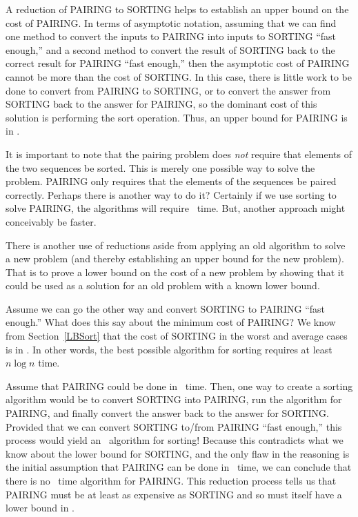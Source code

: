 A reduction of PAIRING to SORTING helps to establish an upper
bound on the cost of PAIRING.
In terms of asymptotic notation, assuming that we can find one method
to convert the inputs to PAIRING into inputs to SORTING ``fast
enough,'' and a second method to convert the result of SORTING back to
the correct result for PAIRING ``fast enough,'' then the asymptotic
cost of PAIRING cannot be more than the cost of SORTING.
In this case, there is little work to be done to convert from
PAIRING to SORTING, or to convert the answer from SORTING back to
the answer for PAIRING, so the dominant cost of this solution is
performing the sort operation.
Thus, an upper bound for PAIRING is in \Onlogn.

It is important to note that the pairing problem does \emph{not}
require that elements of the two sequences be sorted.
This is merely one possible way to solve the problem.
PAIRING only requires that the elements of the sequences be paired
correctly.
Perhaps there is another way to do it?
Certainly if we use sorting to solve PAIRING,
the algorithms will require \Omeganlogn\ time.
But, another approach might conceivably be faster.

There is another use of reductions aside from applying an old
algorithm to solve a new problem (and thereby establishing an upper
bound for the new problem).
That is to prove a lower bound on the cost of a new problem by showing 
that it could be used as a solution for an old problem with a known
lower bound.

Assume we can go the other way and convert SORTING to PAIRING ``fast
enough.''
What does this say about the minimum cost of
PAIRING?
We know from Section~\ref{LBSort} that the cost of SORTING in the
worst and average cases is
in \Omeganlogn.
In other words, the best possible algorithm for sorting requires at
least \(n \log n\) time.

Assume that PAIRING could be done in \On\ time.
Then, one way to create a sorting algorithm would be to convert
SORTING into PAIRING, run the algorithm for PAIRING,
and finally convert the answer back to the answer for SORTING.
Provided that we can convert SORTING to/from PAIRING ``fast enough,''
this process would yield an \On\ algorithm for sorting!
Because this contradicts what we know about the lower bound for
SORTING, and the only flaw in the reasoning is the initial assumption
that PAIRING can be done in \On\ time, we can conclude that there is no
\On\ time algorithm for PAIRING.
This reduction process tells us that PAIRING
must be at least as
expensive as SORTING and so must itself have a lower bound in
\Omeganlogn.

